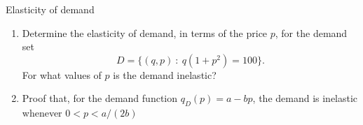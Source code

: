 \documentclass[9pt]{beamer}
\begin{document}













\begin{frame}{Elasticity of demand}

    \begin{enumerate}[leftmargin = 0.5cm, label = \arabic*., rightmargin = 0.2cm]
        \item Determine the elasticity of demand, in terms of the price $p$, for the demand set
        $$
        D = \{(q, p)\ :\ q(1+p^2) = 100\}.
        $$
        For what values of $p$ is the demand inelastic?

        \item Proof that, for the demand function $q_D(p) = a - bp$, the demand is inelastic whenever $0 < p < a/(2b)$
    \end{enumerate}
    
\end{frame}
\end{document}
